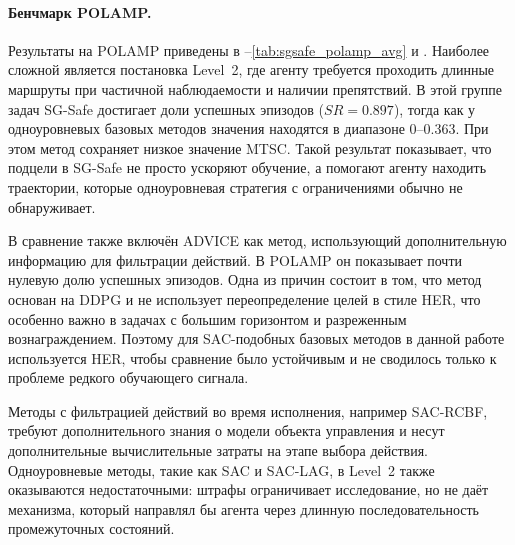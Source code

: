 \paragraph{Бенчмарк POLAMP.}
Результаты на POLAMP приведены в --\ref{tab:sgsafe_polamp_avg} и . Наиболее сложной является постановка Level~2, где агенту требуется проходить длинные маршруты при частичной наблюдаемости и наличии препятствий. В этой группе задач SG-Safe достигает доли успешных эпизодов ($SR = 0.897$), тогда как у одноуровневых базовых методов значения находятся в диапазоне $0$--$0.363$. При этом метод сохраняет низкое значение MTSC. Такой результат показывает, что подцели в SG-Safe не просто ускоряют обучение, а помогают агенту находить траектории, которые одноуровневая стратегия с ограничениями обычно не обнаруживает.

В сравнение также включён ADVICE как метод, использующий дополнительную информацию для фильтрации действий. В POLAMP он показывает почти нулевую долю успешных эпизодов. Одна из причин состоит в том, что метод основан на DDPG и не использует переопределение целей в стиле HER, что особенно важно в задачах с большим горизонтом и разреженным вознаграждением. Поэтому для SAC-подобных базовых методов в данной работе используется HER, чтобы сравнение было устойчивым и не сводилось только к проблеме редкого обучающего сигнала.

Методы с фильтрацией действий во время исполнения, например SAC-RCBF, требуют дополнительного знания о модели объекта управления и несут дополнительные вычислительные затраты на этапе выбора действия. Одноуровневые методы, такие как SAC и SAC-LAG, в Level~2 также оказываются недостаточными: штрафы ограничивает исследование, но не даёт механизма, который направлял бы агента через длинную последовательность промежуточных состояний.


